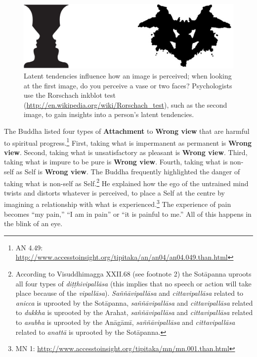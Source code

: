 \begin{figure}[h]
\centering
\includegraphics[width=1\linewidth]{./Diagrams/Perception}
\caption{Latent tendencies influence how an image is perceived; when looking at the first image, do you perceive a vase or two faces? Psychologists use the Rorschach inkblot test (\url{http://en.wikipedia.org/wiki/Rorschach_test}), such as the second image, to gain insights into a person’s latent tendencies.}
\label{fig:Perception}
\end{figure}

The Buddha listed four types of \textbf{Attachment} to \textbf{Wrong view} that are harmful to spiritual progress.\footnote{AN 4.49: \url{http://www.accesstoinsight.org/tipitaka/an/an04/an04.049.than.html}} First, taking what is impermanent as permanent is \textbf{Wrong view}. Second, taking what is unsatisfactory as pleasant is \textbf{Wrong view}. Third, taking what is impure to be pure is \textbf{Wrong view}. Fourth, taking what is non-self as Self is \textbf{Wrong view}. The Buddha frequently highlighted the danger of taking what is non-self as Self.\footnote{According to Visuddhimagga XXII.68 (see footnote 2) the Sotāpanna uproots all four types of \textit{diṭṭhivipallāsa} (this implies that no speech or action will take place because of the \textit{vipallāsa}). \textit{Saññāvipallāsa} and \textit{cittavipallāsa} related to \textit{anicca} is uprooted by the Sotāpanna, \textit{saññāvipallāsa} and \textit{cittavipallāsa} related to \textit{dukkha} is uprooted by the Arahat, \textit{saññāvipallāsa} and \textit{cittavipallāsa} related to \textit{asubha} is uprooted by the Anāgāmī, \textit{saññāvipallāsa} and \textit{cittavipallāsa} related to \textit{anattā} is uprooted by the Sotāpanna.} He explained how the ego of the untrained mind twists and distorts whatever is perceived, to place a Self at the centre by imagining a relationship with what is experienced.\footnote{MN 1: \url{http://www.accesstoinsight.org/tipitaka/mn/mn.001.than.html}} The experience of pain becomes “my pain,” “I am in pain” or “it is painful to me.” All of this happens in the blink of an eye.

